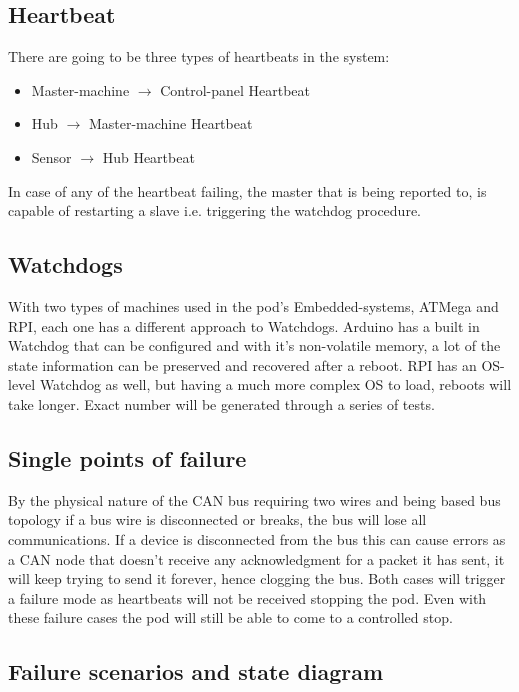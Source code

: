     \subsection{Heartbeat}
    There are going to be three types of heartbeats in the system:
    \begin{itemize}
      \item Master-machine $\rightarrow$ Control-panel Heartbeat
      \item Hub $\rightarrow$ Master-machine Heartbeat
      \item Sensor $\rightarrow$ Hub Heartbeat
    \end{itemize}
    
    In case of any of the heartbeat failing, the master that is being reported to, is capable of restarting a slave i.e. triggering the watchdog procedure.
    
	\subsection{Watchdogs}
    With two types of machines used in the pod's Embedded-systems, ATMega and RPI, each one has a different approach to Watchdogs. Arduino has a built in Watchdog that can be configured and with it's non-volatile memory, a lot of the state information can be preserved and recovered after a reboot. RPI has an OS-level Watchdog as well, but having a much more complex OS to load, reboots will take longer. Exact number will be generated through a series of tests.
   
    \subsection{Single points of failure}
    By the physical nature of the CAN bus requiring two wires and being based bus topology if a bus wire is disconnected or breaks, the bus will lose all communications. If a device is disconnected from the bus this can cause errors as a CAN node that doesn't receive any acknowledgment for a packet it has sent, it will keep trying to send it forever, hence clogging the bus. Both cases will trigger a failure mode as heartbeats will not be received stopping the pod. Even with these failure cases the pod will still be able to come to a controlled stop. 
    
    \subsection {Failure scenarios and state diagram}
    
